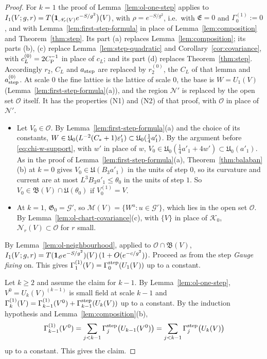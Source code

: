\begin{proof}
For $k=1$ the proof of Lemma~\ref{lem:ol-one-step} applies to $I_1(V;g,r)=T\big(\mathbf 1_{\mathscr N_r(V)}e^{-S/g^2}\big)(V)$, with $\rho=e^{-S/g^2}$, i.e.\ with $\mathfrak E=0$ and $\Gamma^{(1)}_0:=0$, and with Lemma~\ref{lem:first-step-formula} in place of Lemma~\ref{lem:composition} and Theorem~\ref{thm:step}. Its part (a) replaces Lemma~\ref{lem:composition}; its parts (b), (c) replace Lemma~\ref{lem:step-quadratic} and Corollary~\ref{cor:covariance}, with $c^{(0)}_L=2C_{\rm P}^{-1}$ in place of $c_L$; and its part (d) replaces Theorem~\ref{thm:step}. Accordingly $r_2$, $C_L$ and $a_{\rm step}$ are replaced by $r^{(0)}_2$, the $C_L$ of that lemma and $a^{(0)}_{\rm step}$. At scale $0$ the fine lattice is the lattice of scale $0$, the base is $W=U_1(V)$ (Lemma~\ref{lem:first-step-formula}(a)), and the region $\mathscr N'$ is replaced by the open set $\mathscr O$ itself. It has the properties (N1) and (N2) of that proof, with $\mathscr O$ in place of $\mathscr N'$.
\begin{itemize}
\item[(N1)] Let $V_0\in\mathscr O$. By Lemma~\ref{lem:first-step-formula}(a) and the choice of its constants, $W\in\mathfrak U_0(L^{-2}(C_*+1)\varepsilon'_1)\subset\mathfrak U_0(\frac14a'_1)$. By the argument before \eqref{eq:chi-w-support}, with $w'$ in place of $w$, $V_0\in\mathfrak U_0(\frac14a'_1+4w')\subset\mathfrak U_0(a'_1)$. As in the proof of Lemma~\ref{lem:first-step-formula}(a), Theorem~\ref{thm:balaban}(b) at $k=0$ gives $V_0\in\mathfrak U(B_3a'_1)$ in the units of step $0$, so its curvature and current are at most $L^3B_3a'_1\le\theta_0$ in the units of step $1$. So $V_0\in\mathfrak B(V)\cap\mathfrak U(\theta_0)$ if $V_0^{(1)}=V$.
\item[(N2)] At $k=1$, $\mathfrak G_0=\mathcal G'$, so $\mathscr M(V)=\{W^u:u\in\mathcal G'\}$, which lies in the open set $\mathscr O$. By Lemma~\ref{lem:ol-chart-covariance}(c), with $\{V\}$ in place of $\mathcal K_0$, $\mathscr N_r(V)\subset\mathscr O$ for $r$ small.
\end{itemize}
By Lemma~\ref{lem:ol-neighbourhood}, applied to $\mathscr O\cap\mathfrak B(V)$, $I_1(V;g,r)=T(\mathbf 1_{\mathscr O}e^{-S/g^2})(V)\,(1+O(e^{-c/g^2}))$. Proceed as from the step \emph{Gauge fixing} on. This gives $\Gamma^{(1)}_1(V)=\Gamma^{\rm step}_0(U_1(V))$ up to a constant.

Let $k\ge2$ and assume the claim for $k-1$. By Lemma~\ref{lem:ol-one-step}, $V^0=U_k(V)^{(k-1)}$ is small field at scale $k-1$ and $\Gamma^{(1)}_k(V)=\Gamma^{(1)}_{k-1}(V^0)+\Gamma^{\rm step}_{k-1}(U_k(V))$ up to a constant. By the induction hypothesis and Lemma~\ref{lem:composition}(b),
\[
\Gamma^{(1)}_{k-1}(V^0)=\sum_{j<k-1}\Gamma^{\rm step}_j\big(U_{k-1}(V^0)\big)=\sum_{j<k-1}\Gamma^{\rm step}_j\big(U_k(V)\big)
\]
up to a constant. This gives the claim.
\end{proof}


